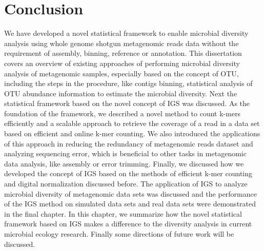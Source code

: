 %
%
%
%


\chapter{Conclusion}




We have developed a novel statistical framework to enable microbial diversity
 analysis using whole genome shotgun metagenomic reads data without the
requirement of assembly, binning, reference or annotation. This dissertation
covers an overview of existing approaches of performing microbial diversity analysis
 of metagenomic samples, especially based on the concept of OTU, including the
steps in the procedure, like contigs binning, statistical
analysis of OTU abundance information to estimate the microbial diversity. Next
the statistical framework based on the novel concept of IGS was discussed. As
the foundation of the framework, we described a novel method to count k-mers
efficiently and a scalable approach to retrieve the coverage of a read in a 
data set based on efficient and online k-mer counting. We also introduced the
applications of this approach in reducing the redundancy of metagenomic reads
dataset and analyzing sequencing error, which is beneficial to other tasks 
in metagenomic data analysis, like
assembly or error trimming. Finally, we discussed how we developed the concept 
of IGS based on the methods of efficient k-mer counting and digital
normalization discussed before.  
The application of IGS to analyze microbial diversity of metagenomic data sets 
was discussed and the performance of the IGS method on simulated data sets and
real data sets were demonstrated in the final chapter. In this chapter, we
summarize how the novel statistical framework based on IGS makes a difference to
 the diversity analysis in current microbial ecology research. 
Finally some directions of future work will be discussed.

